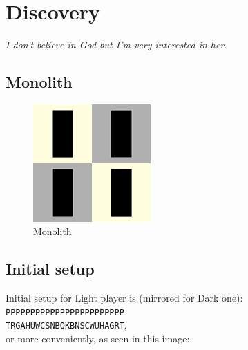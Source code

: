 \documentclass[a5paper,12pt,draft]{book} %
\begin{document}
\clearpage

\chapter*{Discovery}

\begin{flushright}
\parbox{0.8\textwidth}{
\emph{I don’t believe in God but I’m very interested in her. \\
 } }
\end{flushright}

\section*{Monolith}

\noindent
\begin{figure}
\includegraphics[width=0.4\textwidth, keepaspectratio=true]{../gfx/pieces/15_monolith.png}
\caption{Monolith}
\label{fig:monolith}
\end{figure}

\clearpage

\section*{Initial setup}

Initial setup for Light player is (mirrored for Dark one):
\texttt{PPPPPPPPPPPPPPPPPPPPPPPP \\
        TRGAHUWCSNBQKBNSCWUHAGRT}, \\
or more conveniently, as seen in this image:
\end{document}
